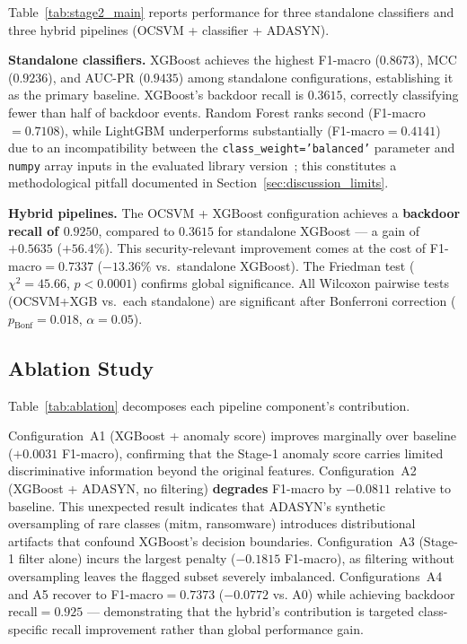 Table~\ref{tab:stage2_main} reports performance for three standalone classifiers
and three hybrid pipelines (OCSVM + classifier + ADASYN).

\textbf{Standalone classifiers.}
XGBoost achieves the highest F1-macro ($0.8673$), MCC ($0.9236$), and AUC-PR ($0.9435$)
among standalone configurations, establishing it as the primary baseline.
XGBoost's backdoor recall is $0.3615$, correctly classifying fewer than half
of backdoor events.
Random Forest ranks second (F1-macro$=0.7108$), while LightGBM underperforms
substantially (F1-macro$=0.4141$) due to an incompatibility between the
\texttt{class\_weight='balanced'} parameter and \texttt{numpy} array inputs in the
evaluated library version~\cite{ref_lgb}; this constitutes a methodological pitfall
documented in Section~\ref{sec:discussion_limits}.

\textbf{Hybrid pipelines.}
The OCSVM + XGBoost configuration achieves a \textbf{backdoor recall of $0.9250$},
compared to $0.3615$ for standalone XGBoost --- a gain of $+0.5635$ ($+56.4\%$).
This security-relevant improvement comes at the cost of F1-macro$=0.7337$
($-13.36\%$ vs.\ standalone XGBoost).
The Friedman test ($\chi^2=45.66$, $p<0.0001$) confirms global significance.
All Wilcoxon pairwise tests (OCSVM+XGB vs.\ each standalone) are significant
after Bonferroni correction ($p_\text{Bonf}=0.018$, $\alpha=0.05$).

\subsection{Ablation Study}
\label{sec:results_ablation}

Table~\ref{tab:ablation} decomposes each pipeline component's contribution.

Configuration~A1 (XGBoost + anomaly score) improves marginally over baseline
($+0.0031$ F1-macro), confirming that the Stage-1 anomaly score carries limited
discriminative information beyond the original features.
Configuration~A2 (XGBoost + ADASYN, no filtering) \textbf{degrades} F1-macro by
$-0.0811$ relative to baseline. This unexpected result indicates that ADASYN's
synthetic oversampling of rare classes (mitm, ransomware) introduces
distributional artifacts that confound XGBoost's decision boundaries.
Configuration~A3 (Stage-1 filter alone) incurs the largest penalty
($-0.1815$ F1-macro), as filtering without oversampling leaves the flagged
subset severely imbalanced.
Configurations~A4 and A5 recover to F1-macro$=0.7373$ ($-0.0772$ vs. A0)
while achieving backdoor recall$=0.925$ --- demonstrating that the hybrid's
contribution is targeted class-specific recall improvement rather than global
performance gain.

